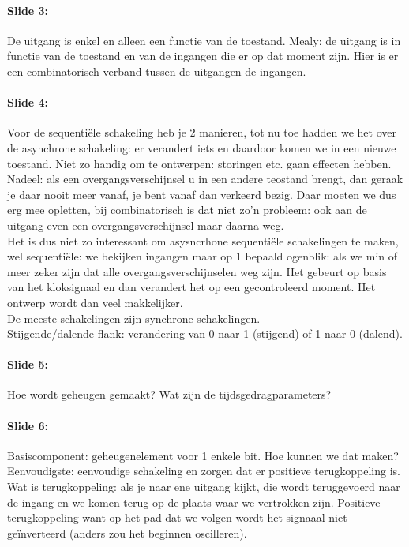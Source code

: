 \documentclass[10pt,a4paper]{book}
\begin{document}
\paragraph{Slide 3:} De uitgang is enkel en alleen een functie van de toestand. Mealy: de uitgang is in functie van de toestand en van de ingangen die er op dat moment zijn. Hier is er een combinatorisch verband tussen de uitgangen de ingangen.

\paragraph{Slide 4:} Voor de sequenti\"ele schakeling heb je 2 manieren, tot nu toe hadden we het over de asynchrone schakeling: er verandert iets en daardoor komen we in een nieuwe toestand. Niet zo handig om te ontwerpen: storingen etc. gaan effecten hebben. Nadeel: als een overgangsverschijnsel u in een andere teostand brengt, dan geraak je daar nooit meer vanaf, je bent vanaf dan verkeerd bezig. Daar moeten we dus erg mee opletten, bij combinatorisch is dat niet zo'n probleem: ook aan de uitgang even een overgangsverschijnsel maar daarna weg.\\
Het is dus niet zo interessant om asysncrhone sequenti\"ele schakelingen te maken, wel sequenti\"ele: we bekijken ingangen maar op 1 bepaald ogenblik: als we min of meer zeker zijn dat alle overgangsverschijnselen weg zijn. Het gebeurt op basis van het kloksignaal en dan verandert het op een gecontroleerd moment. Het ontwerp wordt dan veel makkelijker.\\
De meeste schakelingen zijn synchrone schakelingen.\\
Stijgende/dalende flank: verandering van 0 naar 1 (stijgend) of 1 naar 0 (dalend).

\paragraph{Slide 5:} Hoe wordt geheugen gemaakt? Wat zijn de tijdsgedragparameters? 

\paragraph{Slide 6:} Basiscomponent: geheugenelement voor 1 enkele bit. Hoe kunnen we dat maken? Eenvoudigste: eenvoudige schakeling en zorgen dat er positieve terugkoppeling is. Wat is terugkoppeling: als je naar ene uitgang kijkt, die wordt teruggevoerd naar de ingang en we komen terug op de plaats waar we vertrokken zijn. Positieve terugkoppeling want op het pad dat we volgen wordt het signaaal niet ge\"inverteerd (anders zou het beginnen oscilleren).
\end{document}
